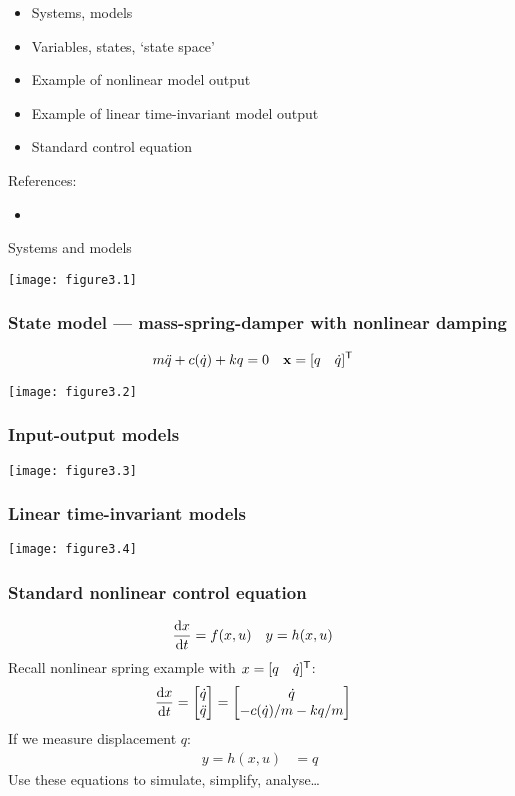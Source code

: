\documentclass{beamer-control}
\begin{document}

\begin{SUMMARY}
\begin{itemize}
\item Systems, models
\item Variables, states, `state space'
\item Example of nonlinear model output
\item Example of linear time-invariant model output
\item Standard control equation
\end{itemize}
\vfill References:
\begin{itemize}
\item {}
\end{itemize}
\end{SUMMARY}


\begin{frame}{Systems and models}

\texttt{[image: figure3.1]}

\end{frame}

\begin{frame}
\frametitle{State model --- mass-spring-damper with nonlinear damping}

\begin{align}
m \ddot q + c(\dot q) + kq &= 0 & \mathbf x &= [q\quad \dot q]^{\mathsf T}
\end{align}

\centering
\texttt{[image: figure3.2]}

\end{frame}

\begin{frame}
\frametitle{Input-output models}
\texttt{[image: figure3.3]}
\end{frame}

\begin{frame}
\frametitle{Linear time-invariant models}
\texttt{[image: figure3.4]}
\end{frame}

\begin{frame}
\frametitle{Standard nonlinear control equation}
\begin{align}
\frac{\mathrm{d} x}{\mathrm{d} t} &= f(x,u) & y &= h(x,u)
\end{align}
Recall nonlinear spring example with $x = [q\quad \dot q]^{\mathsf T}$:
\begin{align}
\frac{\mathrm{d} x}{\mathrm{d} t} &= \begin{bmatrix}\dot q\\\ddot q\end{bmatrix} = \begin{bmatrix}\dot q\\- c(\dot q)/m - kq/m\end{bmatrix}
\end{align}
If we measure displacement $q$:
\begin{align}
y = h(x,u) &= q
\end{align}
Use these equations to simulate, simplify, analyse\dots

\end{frame}



\SUMMARYFRAME
\FINALE
\end{document}
